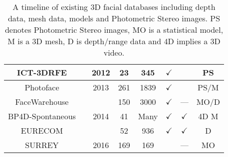\begin{table}[t]
{\begin{tabular}{@{}cccccccc@{}}
ICT-3DRFE                   &\cite{stratou2012exploring}    & 2012                  & 23          & 345         & $\checkmark$ &              & PS     \\ \midrule
Photoface                   &\cite{RefWorks:293}            & 2013                  & 261         & 1839        & $\checkmark$ &              & PS/M   \\ \midrule
FaceWarehouse               &\cite{Cao:2014gy}              & \multirow{3}{*}{2014} & 150         & 3000        & $\checkmark$ & ---          & MO/D   \\
BP4D-Spontaneous            &\cite{Zhang:2014id}            &                       & 41          & Many        & $\checkmark$ & $\checkmark$ & 4D M   \\
EURECOM                     &\cite{min2014kinectfacedb}     &                       & 52          & 936         & $\checkmark$ & $\checkmark$ & D      \\ \midrule
SURREY                      &\cite{Huber:F5Dca9zy}          & 2016                  & 169         & 169         &              & ---          & MO     \\ \bottomrule
\end{tabular}%
}
\caption{A timeline of existing 3D facial databases including depth data, mesh
         data, models and Photometric Stereo images. PS denotes Photometric
         Stereo images, MO is a statistical model, M is a 3D mesh, 
         D is depth/range data and 4D implies a 3D video.}
\label{tbl:timeline_db}
\end{table}



